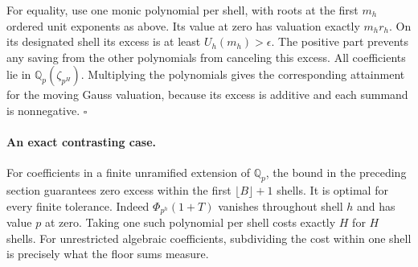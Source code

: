 For equality, use one monic polynomial per shell, with roots at the first
$m_h$ ordered unit exponents as above. Its value at zero has valuation exactly
$m_hr_h$. On its designated shell its excess is at least $U_h(m_h)>\epsilon$.
The positive part prevents any saving from the other polynomials from canceling
this excess. All coefficients lie in $\mathbb Q_p(\zeta_{p^H})$. Multiplying
the polynomials gives the corresponding attainment for the moving Gauss
valuation, because its excess is additive and each summand is nonnegative.
\hfill$\square$

\paragraph{An exact contrasting case.}
For coefficients in a finite unramified extension of $\mathbb Q_p$,
the bound in the preceding section guarantees zero excess within the first
$\lfloor B\rfloor+1$ shells. It is optimal for every finite tolerance.
Indeed $\Phi_{p^h}(1+T)$ vanishes throughout shell $h$ and has value
$p$ at zero. Taking one such polynomial per shell costs exactly $H$ for $H$
shells. For unrestricted algebraic coefficients, subdividing the cost within
one shell is precisely what the floor sums measure.
